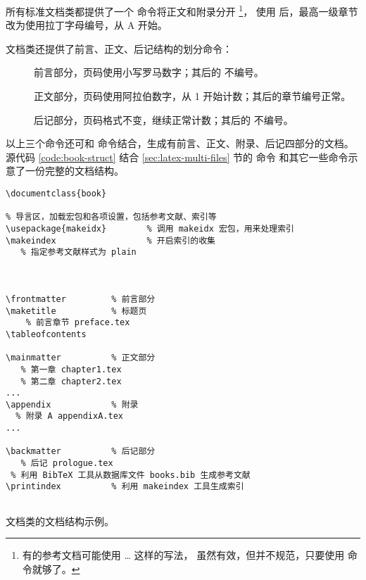 所有标准文档类都提供了一个  命令将正文和附录分开%
\footnote{有的参考文档可能使用   \ldots {}  这样的写法，
虽然有效，但并不规范，只要使用  命令就够了。}，
使用  后，最高一级章节改为使用拉丁字母编号，从 A 开始。

 文档类还提供了前言、正文、后记结构的划分命令：
\begin{description}
  \item[] 前言部分，页码使用小写罗马数字；其后的  不编号。
  \item[] 正文部分，页码使用阿拉伯数字，从 1 开始计数；其后的章节编号正常。
  \item[] 后记部分，页码格式不变，继续正常计数；其后的  不编号。
\end{description}

以上三个命令还可和  命令结合，生成有前言、正文、附录、后记四部分的文档。
源代码 \ref{code:book-struct} 结合 \ref{sec:latex-multi-files} 节的  命令
和其它一些命令示意了一份完整的文档结构。

\begin{sourcecode}[htp]
\begin{Verbatim}
\documentclass{book}

% 导言区，加载宏包和各项设置，包括参考文献、索引等
\usepackage{makeidx}        % 调用 makeidx 宏包，用来处理索引
\makeindex                  % 开启索引的收集
   % 指定参考文献样式为 plain



\frontmatter         % 前言部分
\maketitle           % 标题页
    % 前言章节 preface.tex
\tableofcontents

\mainmatter          % 正文部分
   % 第一章 chapter1.tex
   % 第二章 chapter2.tex
...
\appendix            % 附录
  % 附录 A appendixA.tex
...

\backmatter          % 后记部分
   % 后记 prologue.tex
 % 利用 BibTeX 工具从数据库文件 books.bib 生成参考文献
\printindex          % 利用 makeindex 工具生成索引


\end{Verbatim}
\caption{ 文档类的文档结构示例。}\label{code:book-struct}
\end{sourcecode}

